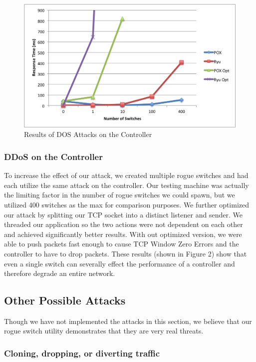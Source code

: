 \begin{figure}
  \includegraphics[width=\linewidth]{DOSAttack.png}
  \caption{Results of DOS Attacks on the Controller \cite{protocol}}
  \label{fig:DOSattacks}
\end{figure}

\subsubsection{DDoS on the Controller}
   To increase the effect of our attack, we created multiple rogue switches and had each utilize the same attack on the controller. Our testing machine was actually the limiting factor in the number of rogue switches we could spawn, but we utilized 400 switches as the max for comparison purposes.  We further optimized our attack by splitting our TCP socket into a distinct listener and sender. We threaded our application so the two actions were not dependent on each other and achieved significantly better results. With out optimized version, we were able to push packets fast enough to cause TCP Window Zero Errors and the controller to have to drop packets.  These results (shown in Figure 2) show that even a single switch can severally effect the performance of a controller and therefore degrade an entire network. 

\subsection{Other Possible Attacks}

Though we have not implemented the attacks in this section, we believe that our rogue switch utility demonstrates that they are very real threats. 

\subsubsection{Cloning, dropping, or diverting traffic}

